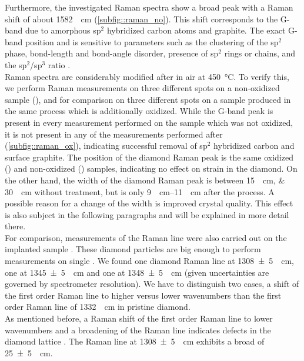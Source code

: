 		Furthermore, the investigated Raman spectra show a broad peak with a Raman shift of about \SI{1582}{\per\centi\meter} (\autoref{subfig::raman_no}).
		This shift corresponds to the G-band due to amorphous sp$^2$ hybridized carbon atoms and graphite.
		The exact G-band position and \lw is sensitive to parameters such as the clustering of the sp$^2$ phase, bond-length and bond-angle disorder, presence of sp$^2$ rings or chains, and the sp$^2$/sp$^3$ ratio \cite{Ferrari2004}.
		\\
		\Nd Raman spectra are considerably modified after \ox in air at \SI{450}{\degreeCelsius}.
		To verify this, we perform Raman measurements on three different spots on a non-oxidized sample (\insituS), and for comparison on three different spots on a sample produced in the same process which is additionally oxidized.
		While the G-band peak is present in every measurement performed on the sample which was not oxidized, it is not present in any of the measurements performed after \ox (\autoref{subfig::raman_ox}), indicating successful removal of sp$^2$ hybridized carbon and surface graphite.
		The position of the diamond Raman peak is the same oxidized (\insituSo) and non-oxidized (\insituSn) samples, indicating no effect on strain in the diamond.
		On the other hand, the width of the diamond Raman peak is between \SIlist{15; 30}{\per\centi\meter} without \ox treatment, but is only \SIrange{9}{11}{\per\centi\meter} after the \ox process.
		A possible reason for a change of the width is improved crystal quality.
		This effect is also subject in the following paragraphs and will be explained in more detail there.
		\\
		For comparison, measurements of the Raman line were also carried out on the implanted sample \implantedTao. 
		These diamond particles are big enough to perform measurements on single \nds.
		We found one diamond Raman line at \SI[separate-uncertainty]{1308+-5}{\per\centi\meter}, one at \SI[separate-uncertainty]{1345+-5}{\per\centi\meter} and one at \SI[separate-uncertainty]{1348+-5}{\per\centi\meter} (given uncertainties are governed by spectrometer resolution).
		We have to distinguish two cases, a shift of the first order Raman line to higher versus lower wavenumbers than the first order Raman line of \SI{1332}{\per\centi\meter} in pristine diamond.
		\\
		As mentioned before, a Raman shift of the first order Raman line to lower wavenumbers and a broadening of the Raman line indicates defects in the diamond lattice \cite{Prawer2004}.
		The Raman line at \SI[separate-uncertainty]{1308+-5}{\per\centi\meter} exhibits a broad \lw of \SI[separate-uncertainty]{25+-5}{\per\centi\meter}.
